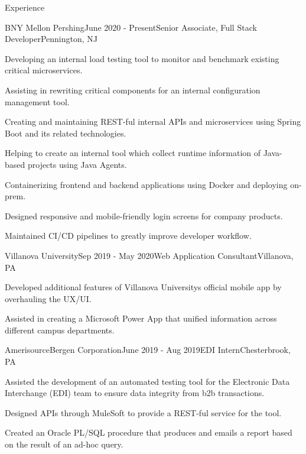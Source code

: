 \documentclass[
	11pt, %
]{resume} %
\begin{document}
\begin{rSection}{Experience}

	\begin{rSubsection}{BNY Mellon \textbar{} Pershing}{June 2020 - Present}{Senior Associate, Full Stack Developer}{Pennington, NJ}
		\item Developing an internal load testing tool to monitor and benchmark existing critical microservices.
		\item Assisting in rewriting critical components for an internal configuration management tool.
		\item Creating and maintaining REST-ful internal APIs and microservices using Spring Boot and its related technologies.
		\item Helping to create an internal tool which collect runtime information of Java-based projects using Java Agents.
		\item Containerizing frontend and backend applications using Docker and deploying on-prem.
		\item Designed responsive and mobile-friendly login screens for company products.
		\item Maintained CI/CD pipelines to greatly improve developer workflow.
	\end{rSubsection}


	\begin{rSubsection}{Villanova University}{Sep 2019 - May 2020}{Web Application Consultant}{Villanova, PA}
		\item Developed additional features of Villanova University\textquotesingle{}s official mobile app by overhauling the UX/UI\@.
		\item Assisted in creating a Microsoft Power App that unified information across different campus departments.
	\end{rSubsection}


	\begin{rSubsection}{AmerisourceBergen Corporation}{June 2019 - Aug 2019}{EDI Intern}{Chesterbrook, PA}
		\item Assisted the development of an automated testing tool for the Electronic Data Interchange (EDI) team to ensure data integrity from b2b transactions.
		\item Designed APIs through MuleSoft to provide a REST-ful service for the tool.
		\item Created an Oracle PL/SQL procedure that produces and emails a report based on the result of an ad-hoc query.
	\end{rSubsection}


\end{rSection}
\end{document}
